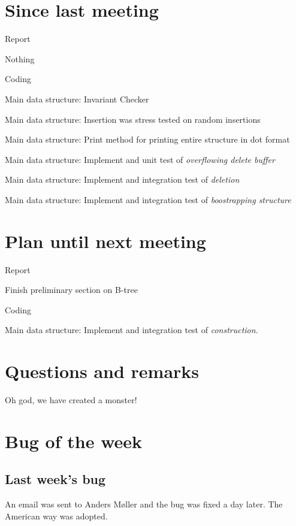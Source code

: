\documentclass[a4paper,11pt,agenda,chair]{meetingmins}
\begin{document}
\maketitle

\section{Since last meeting}
\begin{items}
\item Report
	\begin{items}
		\item Nothing
	\end{items}
\item Coding
	\begin{items}
		\item Main data structure: Invariant Checker
		\item Main data structure: Insertion was stress tested on random insertions
		\item Main data structure: Print method for printing entire structure in dot format
		\item Main data structure: Implement and unit test of \textit{overflowing delete buffer}
		\item Main data structure: Implement and integration test of \textit{deletion}
		\item Main data structure: Implement and integration test of \textit{boostrapping structure}
	\end{items}
\end{items}

\section{Plan until next meeting}
\begin{items}
\item Report
	\begin{items}
		\item Finish preliminary section on B-tree
	\end{items}
\item Coding
	\begin{items}
		\item Main data structure: Implement and integration test of \textit{construction}.
	\end{items}
\end{items}

\section{Questions and remarks}
\begin{items}
	\item Oh god, we have created a monster!
\end{items}



\section{Bug of the week}
\subsection{Last week's bug}
An email was sent to Anders M\o ller and the bug was fixed a day later. The American way was adopted.
\end{document}
